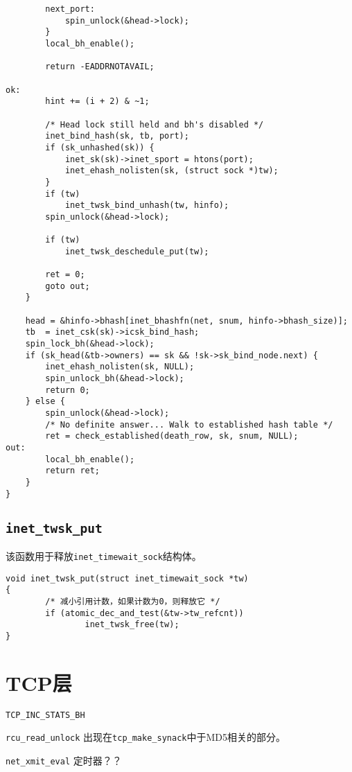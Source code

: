 \begin{verbatim}
        next_port:
            spin_unlock(&head->lock);
        }
        local_bh_enable();

        return -EADDRNOTAVAIL;

ok:
        hint += (i + 2) & ~1;

        /* Head lock still held and bh's disabled */
        inet_bind_hash(sk, tb, port);
        if (sk_unhashed(sk)) {
            inet_sk(sk)->inet_sport = htons(port);
            inet_ehash_nolisten(sk, (struct sock *)tw);
        }
        if (tw)
            inet_twsk_bind_unhash(tw, hinfo);
        spin_unlock(&head->lock);

        if (tw)
            inet_twsk_deschedule_put(tw);

        ret = 0;
        goto out;
    }

    head = &hinfo->bhash[inet_bhashfn(net, snum, hinfo->bhash_size)];
    tb  = inet_csk(sk)->icsk_bind_hash;
    spin_lock_bh(&head->lock);
    if (sk_head(&tb->owners) == sk && !sk->sk_bind_node.next) {
        inet_ehash_nolisten(sk, NULL);
        spin_unlock_bh(&head->lock);
        return 0;
    } else {
        spin_unlock(&head->lock);
        /* No definite answer... Walk to established hash table */
        ret = check_established(death_row, sk, snum, NULL);
out:
        local_bh_enable();
        return ret;
    }
}
\end{verbatim}

\subsection{\texttt{inet_twsk_put}}
该函数用于释放\texttt{inet_timewait_sock}结构体。
\begin{verbatim}
void inet_twsk_put(struct inet_timewait_sock *tw)
{
        /* 减小引用计数，如果计数为0，则释放它 */
        if (atomic_dec_and_test(&tw->tw_refcnt))
                inet_twsk_free(tw);
}
\end{verbatim}

\section{TCP层}

    \texttt{TCP_INC_STATS_BH}

    \texttt{rcu_read_unlock} 出现在\texttt{tcp_make_synack}中于MD5相关的部分。
    
    \texttt{net_xmit_eval}   定时器？？
